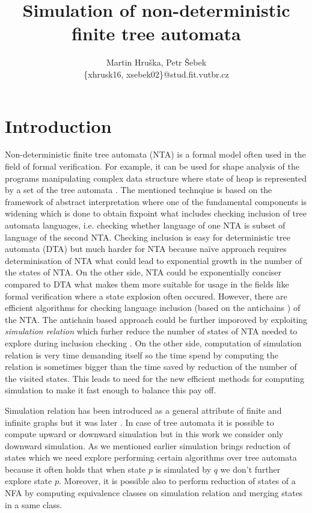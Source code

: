 \documentclass[a4paper, 12pt]{article}
\title{Simulation of non-deterministic finite tree automata}
\author{Martin Hruška, Petr Šebek\\\{xhrusk16, xsebek02\}@stud.fit.vutbr.cz}
\date{}
\begin{document}
\maketitle

\section{Introduction}
\label{sec:intro}

Non-deterministic finite tree automata (NTA) is a formal model often used in the field of formal verification.
For example, it can be used for shape analysis of the programs manipulating complex data structure where
state of heap is represented by a set of the tree automata \cite{methods12}.
The mentioned technqiue is based on the framework of abstract interpretation where one of the fundamental components
is widening which is done to obtain fixpoint what includes checking inclusion of tree automata languages, i.e.
checking whether language of one NTA is subset of language of the second NTA.
Checking inclusion is easy for deterministic tree automata (DTA) but much harder for NTA because
na{\"i}ve approach requires determinisation of NTA what could lead to exponential growth in the number of the states of NTA.
On the other side, NTA could be exponentially conciser compared to DTA what makes them more suitable for usage in the fields
like formal verification where a state explosion often occured.
However, there are efficient algorithms for checking language inclusion (based on the antichains \cite{tacas10}) of the NTA.
The antichain based approach could be further imporoved by exploiting \emph{simulation relation} which furher reduce
the number of states of NTA needed to explore during inclusion checking \cite{tacas10}.
On the other side, computation of simulation relation is very time demanding itself so the time spend by computing the relation
is sometimes bigger than the time saved by reduction of the number of the visited states.
This leads to need for the new efficient methods for computing simulation to make it fast enough to balance this pay off. 

Simulation relation has been introduced as a general attribute of finite and infinite graphs \cite{focs95}
but it was later .
In case of tree automata it is possible to compute upward or downward simulation but in this
work we consider only downward simulation.
As we mentioned earlier simulation brings reduction of states which we need explore performing
certain algorithms over tree automata because it often holds that when state $p$ is simulated by $q$
we don't further explore state $p$.
Moreover, it is possible also to perform reduction of states of a NFA by computing
equivalence classes on simulation relation and merging states in a same class.
\end{document}
